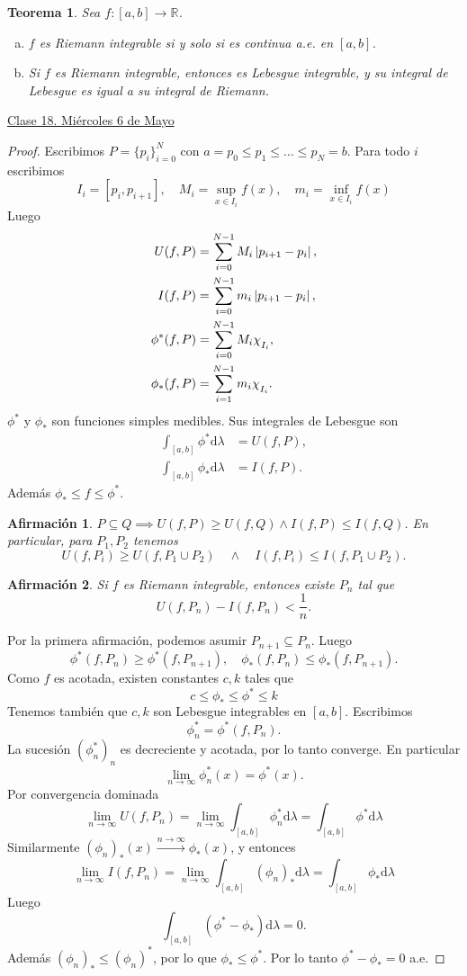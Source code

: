 \documentclass{article}
\newtheorem{theorem}{Teorema}[subsection]
\newtheorem{claim}{Afirmación}
\theoremstyle{definition}
\theoremstyle{remark}
\numberwithin{equation}{section}
\newcommand{\R}{\mathbb{R}}
\renewcommand{\d}{\mathrm{d}}
\newcommand{\lam}{\lambda}
\newcommand{\oo}{\infty}
\newcommand{\abs}[1]{\left| #1 \right|}
\newcommand{\Chi}[1]{\chi_{\raisebox{-.5ex}{$\scriptstyle #1$}}}
\newcommand{\fecha}[1]{\begin{flushright} \underline{#1} \end{flushright}}
\begin{document}
\begin{theorem}
  Sea $f \colon [a,b] \to \R$.
  \begin{enumerate}[(a)]
    \item $f$ es Riemann integrable si y solo si es continua a.e. en $[a,b]$.
    \item Si $f$ es Riemann integrable, entonces es Lebesgue integrable, y su integral de Lebesgue es igual a su integral de Riemann.
  \end{enumerate}
\end{theorem}
\fecha{Clase 18. Miércoles 6 de Mayo}
\begin{proof}
  Escribimos $P = \{p_i\}_{i=0}^N$ con $a = p_0 \leq p_1 \leq \dots \leq p_N = b$.
  Para todo $i$ escribimos 
  \[ I_i = [p_i, p_{i+1}], \quad M_i = \sup_{x \in I_i} f(x), \quad m_i = \inf_{x \in I_i} f(x) \]
  Luego
  \begin{align*}
      U(f,P) &= \sum_{i=0}^{N-1} M_i \abs{p_{i+1} - p_i}, \\
      I(f,P) &= \sum_{i=0}^{N-1} m_i \abs{p_{i+1} - p_i}, \\
      \phi^*(f,P) &= \sum_{i=0}^{N-1} M_i \Chi{I_i}, \\
      \phi_*(f,P) &= \sum_{i=1}^{N-1} m_i \Chi{I_i}.
  \end{align*}
  $\phi^*$ y $\phi_*$ son funciones simples medibles. Sus integrales de Lebesgue son 
  \begin{align*}
      \int_{[a,b]} \phi^* \d\lam &= U(f,P), \\
      \int_{[a,b]} \phi_* \d\lam &= I(f,P).
  \end{align*}
  Además $\phi_* \leq f \leq \phi^*$.

  \begin{claim}
    $P \subseteq Q \implies U(f,P) \geq U(f,Q) \land I(f,P) \leq I(f,Q)$.
    En particular, para $P_1,P_2$ tenemos 
    \[ U(f,P_i) \geq U(f,P_1 \cup P_2) \quad\land\quad I(f,P_i) \leq I(f,P_1 \cup P_2). \]
  \end{claim}

  \begin{claim}
    Si $f$ es Riemann integrable, entonces existe $P_n$ tal que 
    \[ U(f,P_n) - I(f,P_n) < \frac{1}{n}. \]
  \end{claim}
  Por la primera afirmación, podemos asumir $P_{n+1} \subseteq P_n$. Luego 
  \[ \phi^*(f,P_n) \geq \phi^*(f,P_{n+1}), \quad \phi_*(f,P_n) \leq \phi_*(f,P_{n+1}). \]
  Como $f$ es acotada, existen constantes $c,k$ tales que 
  \[ c \leq \phi_* \leq \phi^* \leq k \]
  Tenemos también que $c,k$ son Lebesgue integrables en $[a,b]$. Escribimos 
  \[ \phi_n^* = \phi^*(f,P_n). \]
  La sucesión $(\phi_n^*)_n$ es decreciente y acotada, por lo tanto converge. En particular 
  \[ \lim_{n\to\oo} \phi_n^*(x) = \phi^*(x). \]
  Por convergencia dominada 
  \[ \lim_{n\to\oo} U(f,P_n) = \lim_{n\to\oo} \int_{[a,b]} \phi_n^* \d\lam = \int_{[a,b]} \phi^* \d\lam \]
  Similarmente $(\phi_n)_*(x) \xrightarrow{n\to\oo} \phi_*(x)$, y entonces
  \[ \lim_{n\to\oo} I(f,P_n) = \lim_{n\to\oo} \int_{[a,b]} (\phi_n)_* \d\lam = \int_{[a,b]} \phi_* \d\lam \]
  Luego
  \[ \int_{[a,b]} (\phi^* - \phi_*) \d\lam = 0. \]
  Además $(\phi_n)_* \leq (\phi_n)^*$, por lo que $\phi_* \leq \phi^*$. Por lo tanto $\phi^* - \phi_* = 0$ a.e.


\end{proof}
\end{document}
